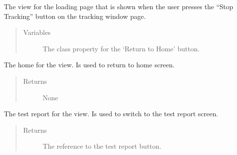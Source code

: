 \documentclass[letterpaper,10pt,english]{sphinxmanual}
\begin{document}
\begin{fulllineitems}
\label{\detokenize{index:src.Views.View_LoadingScreen.LoadingWindow}}
The view for the loading page that is shown when the user presses the “Stop Tracking” button on the tracking window page.
\begin{quote}\begin{description}
\item[{Variables}] \leavevmode
{} \textendash{} The class property for the ‘Return to Home’ button.

\end{description}\end{quote}

\begin{fulllineitems}
\label{\detokenize{index:src.Views.View_LoadingScreen.LoadingWindow.BtnHome}}
The home for the view. Is used to return to home screen.
\begin{quote}\begin{description}
\item[{Returns}] \leavevmode
None

\end{description}\end{quote}

\end{fulllineitems}


\begin{fulllineitems}
\label{\detokenize{index:src.Views.View_LoadingScreen.LoadingWindow.BtnTestReport}}
The test report for the view. Is used to switch to the test report screen.
\begin{quote}\begin{description}
\item[{Returns}] \leavevmode
The reference to the test report button.


\end{description}
\end{quote}
\end{fulllineitems}
\end{fulllineitems}
\end{document}
